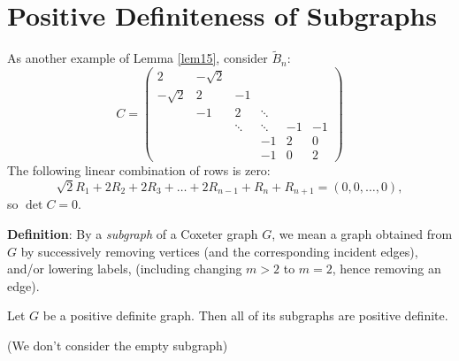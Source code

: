 \section{Positive Definiteness of Subgraphs}

As another example of Lemma \ref{lem15}, consider $\widetilde{B}_n$:
\[
    C = \begin{pmatrix}
        2 & -\sqrt{2} &  & \\
        -\sqrt{2} & 2 & -1 & \\
         & -1 & 2 & \ddots & \\
         & & \ddots & \ddots & -1 & -1 \\
         & & & -1 & 2 & 0 \\
         & & & -1 & 0 & 2
    \end{pmatrix}
\]
The following linear combination of rows is zero:
\[
    \sqrt{2} R_1 + 2 R_2 + 2 R_3 + \dots + 2 R_{n-1} + R_n + R_{n+1} = (0, 0, \dots, 0),
\]
so $\det C = 0$.

{\bf Definition}: By a {\em subgraph} of a Coxeter graph $G$, we mean a graph
obtained from $G$ by successively removing vertices (and the corresponding
incident edges), and/or lowering labels, (including changing $m>2$ to $m=2$,
hence removing an edge).


\begin{proposition} \label{prop16}
Let $G$ be a positive definite graph. Then all of its subgraphs are positive
definite.
\end{proposition}

(We don't consider the empty subgraph)

